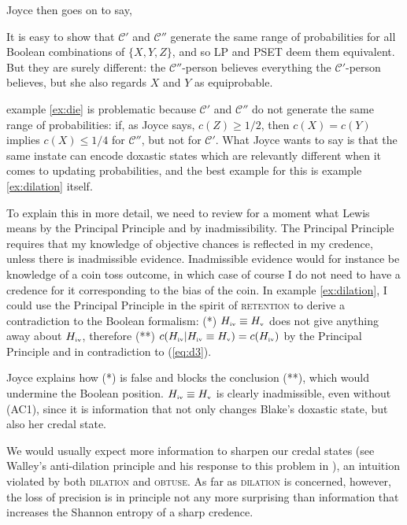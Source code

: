 \documentclass[12pt]{article}
\begin{document}
Joyce then goes on to say,

\begin{quotex}
  It is easy to show that $\mathcal{C}'$ and $\mathcal{C}''$ generate
  the same range of probabilities for all Boolean combinations of
  $\{X,Y,Z\}$, and so LP and PSET deem them equivalent. But they are
  surely different: the $\mathcal{C}''$-person believes everything the
  $\mathcal{C}'$-person believes, but she also regards $X$ and $Y$ as
  equiprobable.
\end{quotex}

example \ref{ex:die} is problematic because $\mathcal{C}'$ and
$\mathcal{C}''$ do not generate the same range of probabilities: if,
as Joyce says, $c(Z)\geq1/2$, then $c(X)=c(Y)$ implies $c(X)\leq{}1/4$
for $\mathcal{C}''$, but not for $\mathcal{C}'$. What Joyce wants to
say is that the same instate can encode doxastic states which are
relevantly different when it comes to updating probabilities, and the
best example for this is example \ref{ex:dilation} itself.

To explain this in more detail, we need to review for a moment what
Lewis means by the Principal Principle and by inadmissibility. The
Principal Principle requires that my knowledge of objective chances is
reflected in my credence, unless there is inadmissible evidence.
Inadmissible evidence would for instance be knowledge of a coin toss
outcome, in which case of course I do not need to have a credence for
it corresponding to the bias of the coin. In example
\ref{ex:dilation}, I could use the Principal Principle in the spirit
of \textsc{retention} to derive a contradiction to the Boolean
formalism: (*) $H_{\mbox{\tiny{iv}}}\equiv{}H_{\mbox{\tiny{v}}}$ does
not give anything away about $H_{\mbox{\tiny{iv}}}$, therefore (**)
$c(H_{\mbox{\tiny{iv}}}|H_{\mbox{\tiny{iv}}}\equiv{}H_{\mbox{\tiny{v}}})=c(H_{\mbox{\tiny{iv}}})$
by the Principal Principle and in contradiction to (\ref{eq:d3}). 

Joyce explains how (*) is false and blocks the conclusion (**), which
would undermine the Boolean position.
$H_{\mbox{\tiny{iv}}}\equiv{}H_{\mbox{\tiny{v}}}$ is clearly
inadmissible, even without (AC1), since it is information that not
only changes Blake's doxastic state, but also her credal state.

We would usually expect more information to sharpen our credal states
(see Walley's anti-dilation principle and his response to this problem
in ), an intuition violated by both
\textsc{dilation} and \textsc{obtuse}. As far as \textsc{dilation} is
concerned, however, the loss of precision is in principle not any more
surprising than information that increases the Shannon entropy of a
sharp credence.
\end{document}
